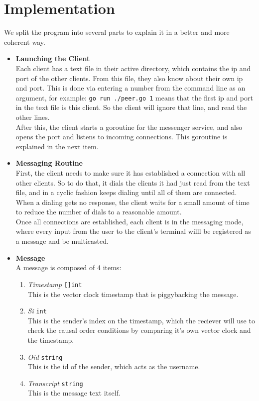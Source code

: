 \documentclass[11pt,reqno]{amsart}
\newcommand{\code}[1]{\texttt{#1}}
\begin{document}
\section{Implementation}
We split the program into several parts to explain it in a better and more coherent way.
\begin{itemize}
	\item \textbf{Launching the Client} \\
	Each client has a text file in their active directory, which contains the ip and port of the other clients. From this file, they also know about their own ip and port. This is done via entering a number from the command line as an argument, for example: \code{go run ./peer.go 1} means that the first ip and port in the text file is this client. So the client will ignore that line, and read the other lines. \\
	After this, the client starts a goroutine for the messenger service, and also opens the port and listens to incoming connections. This goroutine is explained in the next item.
	\item \textbf{Messaging Routine} \\
	First, the client needs to make sure it has established a connection with all other clients. So to do that, it dials the clients it had just read from the text file, and in a cyclic fashion keeps dialing until all of them are connected. When a dialing gets no response, the client waits for a small amount of time to reduce the number of dials to a reasonable amount. \\
	Once all connections are established, each client is in the messaging mode, where every input from the user to the client's terminal willl be registered as a message and be multicasted.
	\item \textbf{Message} \\
	A message is composed of 4 items:
	\begin{enumerate}
		\item \textit{Timestamp} \code{[]int} \\ This is the vector clock timestamp that is piggybacking the message.
		\item \textit{Si} \code{int} \\ This is the sender's index on the timestamp, which the reciever will use to check the causal order conditions by comparing it's own vector clock and the timestamp.
		\item \textit{Oid} \code{string} \\ This is the id of the sender, which acts as the username.
		\item \textit{Transcript} \code{string} \\ This is the message text itself.
	\end{enumerate}

\end{itemize}
\end{document}
